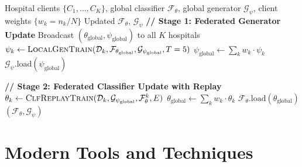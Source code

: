 \documentclass[12pt,a4paper]{report}
\begin{document}
\begin{algorithm}[H]
\caption{FedGen-Rare: Full Global Communication Round (Server)}
\label{alg:fedgen_rare_round}
\begin{algorithmic}[1]
\Require Hospital clients $\{C_1, \ldots, C_K\}$, global classifier $\mathcal{F}_\theta$, global generator $\mathcal{G}_\psi$, client weights $\{w_k = n_k/N\}$
\Ensure Updated $\mathcal{F}_\theta$, $\mathcal{G}_\psi$
\State \textbf{// Stage 1: Federated Generator Update}
\State Broadcast $(\theta_{\text{global}}, \psi_{\text{global}})$ to all $K$ hospitals
    \State $\psi_k \leftarrow \textsc{LocalGenTrain}(\mathcal{D}_k, \mathcal{F}_{\theta_\text{global}}, \mathcal{G}_{\psi_\text{global}}, T=5)$ 
\EndFor
\State $\psi_{\text{global}} \leftarrow \sum_k w_k \cdot \psi_k$ 
\State $\mathcal{G}_\psi.\text{load}(\psi_{\text{global}})$

\State \textbf{// Stage 2: Federated Classifier Update with Replay}
    \State $\theta_k \leftarrow \textsc{ClfReplayTrain}(\mathcal{D}_k, \mathcal{G}_{\psi_\text{global}}, \mathcal{F}_\theta^k, E)$ 
\EndFor
\State $\theta_{\text{global}} \leftarrow \sum_k w_k \cdot \theta_k$ 
\State $\mathcal{F}_\theta.\text{load}(\theta_{\text{global}})$
\State \Return $(\mathcal{F}_\theta, \mathcal{G}_\psi)$
\end{algorithmic}
\end{algorithm}

\newpage

\chapter{Modern Tools and Techniques}
\label{ch:tools}
\end{document}
